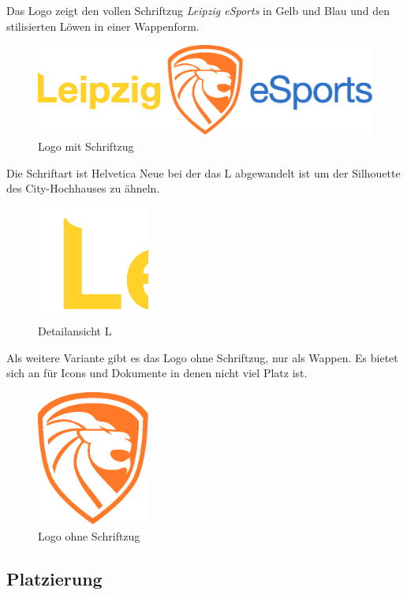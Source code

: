 \documentclass{article}
\begin{document}
Das Logo zeigt den vollen Schriftzug \emph{Leipzig eSports} in Gelb und Blau und den stilisierten Löwen in einer Wappenform.
\begin{figure}[H]
\includegraphics[width=\textwidth]{Docs/Logo.eps}
\caption{Logo mit Schriftzug}
\end{figure}

Die Schriftart ist Helvetica Neue bei der das L abgewandelt ist um der Silhouette des City-Hochhauses zu ähneln.

\begin{figure}[H]
\centering
\includegraphics[width=0.33\textwidth]{Docs/logo_detail_L.png}
\caption{Detailansicht L}
\end{figure}


Als weitere Variante gibt es das Logo ohne Schriftzug, nur als Wappen. Es bietet sich an für Icons und Dokumente in denen nicht viel Platz ist.

\begin{figure}[H]
\centering
\includegraphics[width=0.33\textwidth]{Docs/Emblem.eps}
\caption{Logo ohne Schriftzug}
\end{figure}

\subsection{Platzierung}
\end{document}
